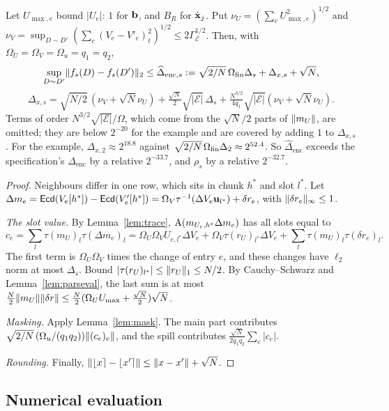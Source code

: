 \begin{corollary}\label{cor:sensZ}
Let $U_{\max,e}$ bound $|U_e|$: $1$ for $\mathbf{b}$, and $B_R$ for $\dot{\mathbf{x}}_j$. Put $\nu_U=(\sum_eU_{\max,e}^2)^{1/2}$ and $\nu_V=\sup_{D\sim D'}(\sum_e(V_e-V'_e)_t^2)^{1/2}\le2\Gamma_{\mathcal E}^{1/2}$. Then, with $\Omega_U=\Omega_V=\Omega_u=q_1=q_2$,
\[
  \sup_{D\sim D'}\lVert f_s(D)-f_s(D')\rVert_2\le\widehat\Delta_{\mathrm{enc},s}:=\sqrt{2/N}\,\Omega_{\mathrm{fin}}\Delta_s+\Delta_{x,s}+\sqrt N,
\]
\[
  \Delta_{x,s}=\sqrt{N/2}\,(\nu_V+\sqrt N\nu_U)+\tfrac{\sqrt N}2\sqrt{|\mathcal E|}\,\Delta_s+\tfrac{N^{3/2}}{4q_1}\sqrt{|\mathcal E|}(\nu_V+\sqrt N\nu_U).
\]
Terms of order $N^{3/2}\sqrt{|\mathcal E|}/\Omega$, which come from the $\sqrt N/2$ parts of $\lVert m_U\rVert$, are omitted; they are below $2^{-20}$ for the example and are covered by adding $1$ to $\Delta_{x,s}$. For the example, $\Delta_{x,2}\approx2^{18.8}$ against $\sqrt{2/N}\,\Omega_{\mathrm{fin}}\Delta_2\approx2^{52.4}$. So $\widehat\Delta_{\mathrm{enc}}$ exceeds the specification's $\Delta_{\mathrm{enc}}$ by a relative $2^{-33.7}$, and $\rho_s$ by a relative $2^{-32.7}$.
\end{corollary}
\begin{proof}
Neighbours differ in one row, which sits in chunk $h^*$ and slot $l^*$. Let $\Delta m_e=\mathsf{Ecd}(V_e[h^*])-\mathsf{Ecd}(V'_e[h^*])=\Omega_V\tau^{-1}(\Delta V_e\mathbf u_{l^*})+\delta r_e$, with $\lVert \delta r_e\rVert_\infty\le1$.

\emph{The slot value.} By Lemma~\ref{lem:trace}, $\mathrm{A}(m_{U_e,h^*}\Delta m_e)$ has all slots equal to
\[
  c_e=\sum_l\tau(m_U)_l\tau(\Delta m_e)_l=\Omega_U\Omega_VU_{e,l^*}\Delta V_e+\Omega_V\tau(r_U)_{l^*}\Delta V_e+\sum_l\tau(m_U)_l\tau(\delta r_e)_l .
\]
The first term is $\Omega_U\Omega_V$ times the change of entry $e$, and these changes have $\ell_2$ norm at most $\Delta_s$. Bound $|\tau(r_U)_{l^*}|\le\lVert r_U\rVert_1\le N/2$. By Cauchy--Schwarz and Lemma~\ref{lem:parseval}, the last sum is at most $\tfrac N2\lVert m_U\rVert\lVert \delta r\rVert\le\tfrac N2(\Omega_UU_{\max}+\tfrac{\sqrt N}2)\sqrt N$.

\emph{Masking.} Apply Lemma~\ref{lem:mask}. The main part contributes $\sqrt{2/N}\,(\Omega_u/(q_1q_2))\lVert (c_e)_e\rVert$, and the spill contributes $\tfrac{\sqrt N}{2q_1q_2}\sum_e|c_e|$.

\emph{Rounding.} Finally, $\lVert \lfloor x\rceil-\lfloor x'\rceil\rVert\le\lVert x-x'\rVert+\sqrt N$.
\end{proof}

\subsection{Numerical evaluation}
\label{sec:numeric}

